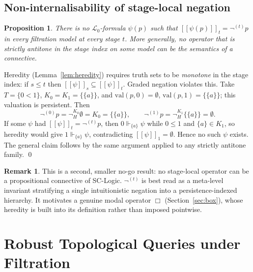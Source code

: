\documentclass[final,12pt]{elsarticle}
\newcommand{\llbracket}{[\![}
\newcommand{\rrbracket}{]\!]}
\theoremstyle{plain}
\newtheorem{prop}[thm]{Proposition}
\theoremstyle{definition}
\newtheorem{rem}[thm]{Remark}
\begin{document}
\subsection{Non-internalisability of stage-local negation}
\label{subsec:non-internalizable}

\begin{prop}
\label{prop:non-internalizable}
There is no \(\mathcal{L}_0\)-formula \(\psi(p)\) such that
\(\llbracket\psi(p)\rrbracket_t=\neg^{(t)}p\) in every filtration model at every
stage \(t\).  More generally, no operator that is strictly antitone in the
stage index on some model can be the semantics of a connective.
\end{prop}

\proof
Heredity (Lemma~\ref{lem:heredity}) requires truth sets to be \emph{monotone}
in the stage index: if \(s\le t\) then
\(\llbracket\psi\rrbracket_s\subseteq\llbracket\psi\rrbracket_t\).  Graded
negation violates this.  Take \(T=\{0<1\}\), \(K_0=K_1=\{\{a\}\}\), and
\(\mathrm{val}(p,0)=\emptyset\), \(\mathrm{val}(p,1)=\{\{a\}\}\); this
valuation is persistent.  Then
\[
  \neg^{(0)}p=\neg_H^{K_0}\emptyset=K_0=\{\{a\}\},
  \qquad
  \neg^{(1)}p=\neg_H^{K_1}\{\{a\}\}=\emptyset .
\]
If some \(\psi\) had \(\llbracket\psi\rrbracket_t=\neg^{(t)}p\), then
\(0\Vdash_{\{a\}}\psi\) while \(0\le 1\) and \(\{a\}\in K_1\), so heredity
would give \(1\Vdash_{\{a\}}\psi\), contradicting
\(\llbracket\psi\rrbracket_1=\emptyset\).  Hence no such \(\psi\) exists.  The
general claim follows by the same argument applied to any strictly antitone
family.
\qed

\begin{rem}
This is a second, smaller no-go result: no stage-local operator can be a
propositional connective of SC-Logic.  \(\neg^{(t)}\) is best read as a
meta-level invariant stratifying a single intuitionistic negation into a
persistence-indexed hierarchy.  It motivates a genuine modal operator
\(\Box\) (Section~\ref{sec:box}), whose heredity is built into its definition
rather than imposed pointwise.
\end{rem}



\section{Robust Topological Queries under Filtration}
\label{sec:application}
\end{document}
